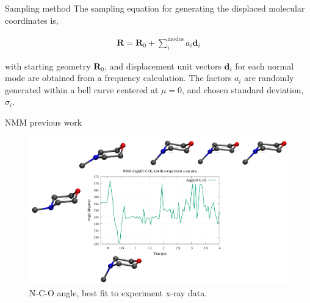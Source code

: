 \documentclass{beamer}
\begin{document}
\begin{frame}{Sampling method}
	The sampling equation for generating the displaced molecular coordinates is,
	
	\begin{eqnarray}
	\textbf{R} = \textbf{R}_0 + \sum_i^{\textrm{modes}} a_i\textbf{d}_i
	\end{eqnarray}
	
	with starting geometry $\textbf{R}_0$, and displacement unit vectors $\textbf{d}_i$ for each normal mode are obtained from a frequency calculation.  The factors $a_i$ are randomly generated within a bell curve centered at $\mu=0$, and chosen standard deviation, $\sigma_i$. 
\end{frame}


\begin{frame}{NMM previous work}
	\begin{figure}[H]
	\centering
		\includegraphics[width=\textwidth]{geomovie_ppt_slide.png}
		\caption{N-C-O angle, best fit to experiment x-ray data.}
		\label{fig:geomovie-ppt-slide}
	\end{figure}

\end{frame}


\newcommand\m{0}
\newcommand\w{0.32}
\newcommand{\molwidth}{0.1}
\newcommand{\vh}{-10}

\iftrue
\end{document}
